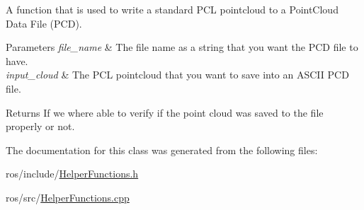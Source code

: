 \-A function that is used to write a standard \-P\-C\-L pointcloud to a \-Point\-Cloud \-Data \-File (\-P\-C\-D). 


\begin{DoxyParams}{\-Parameters}
{\em file\-\_\-name} & \-The file name as a string that you want the \-P\-C\-D file to have. \\
\hline
{\em input\-\_\-cloud} & \-The \-P\-C\-L pointcloud that you want to save into an \-A\-S\-C\-I\-I \-P\-C\-D file.\\
\hline
\end{DoxyParams}
\begin{DoxyReturn}{\-Returns}
\-If we where able to verify if the point cloud was saved to the file properly or not. 
\end{DoxyReturn}


\-The documentation for this class was generated from the following files\-:\begin{DoxyCompactItemize}
\item 
ros/include/\hyperlink{_helper_functions_8h}{\-Helper\-Functions.\-h}\item 
ros/src/\hyperlink{_helper_functions_8cpp}{\-Helper\-Functions.\-cpp}\end{DoxyCompactItemize}
